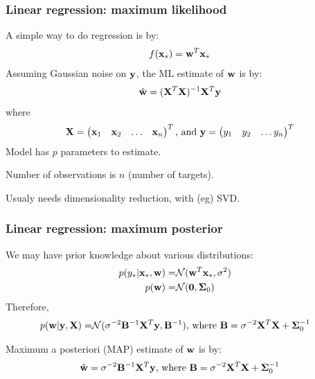 \begin{frame}
\frametitle{Linear regression: maximum likelihood}
A simple way to do regression is by:
\begin{align*}
f({\bf x}_*) = {\bf w}^T {\bf x}_*
\end{align*}
Assuming Gaussian noise on ${\bf y}$, the ML estimate of ${\bf w}$ is by:
\begin{align*}
\hat{\bf w} = ({\bf X}^T{\bf X})^{-1}{\bf X}^T {\bf y}
\end{align*}
where
\begin{align*}
{\bf X} = \begin{pmatrix}{\bf x}_1 & {\bf x}_2 & \hdots & {\bf x}_n\end{pmatrix}^T \text{, and }
{\bf y} = \begin{pmatrix}y_1 & y_2 & \hdots y_n\end{pmatrix}^T
\end{align*}
Model has $p$ parameters to estimate.\par
Number of observations is $n$ (number of targets).\par
Usualy needs dimensionality reduction, with (eg) SVD.
\end{frame}

\begin{frame}
\frametitle{Linear regression: maximum posterior}
We may have prior knowledge about various distributions:
\begin{align*}
p(y_* | {\bf x}_*, {\bf w}) = & \mathcal{N}({\bf w}^T{\bf x}_*, \sigma^2)\cr
p({\bf w}) = & \mathcal{N}({\bf 0},\boldsymbol\Sigma_0)\cr
\end{align*}
Therefore,
\begin{align*}
p({\bf w}|{\bf y},{\bf X})  = & \mathcal{N}(\sigma^{-2}{\bf B}^{-1}{\bf X}^T{\bf y},{\bf B}^{-1}) \text{, where } {\bf B} = \sigma^{-2}{\bf X}^T{\bf X} + \boldsymbol\Sigma_0^{-1}
\end{align*}

Maximum a posteriori (MAP) estimate of ${\bf w}$ is by:
\begin{align*}
\hat{\bf w} = \sigma^{-2}{\bf B}^{-1}{\bf X}^T{\bf y} \text{, where } {\bf B} = \sigma^{-2}{\bf X}^T{\bf X} + \boldsymbol\Sigma_0^{-1}
\end{align*}
\end{frame}

